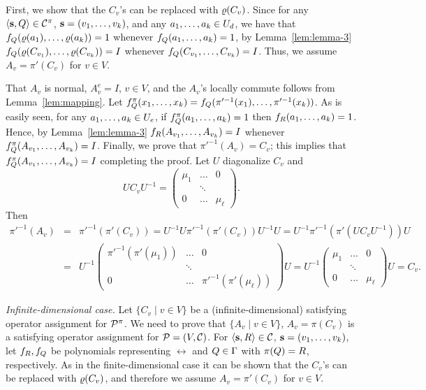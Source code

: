 \documentclass[11pt,letter]{article}
\begin{document}
First, we show that the $C_v$'s can be replaced with $\varrho(C_v)$. Since for any
$\langle {\bf s},Q \rangle\in{\mathcal C}^\pi$, ${\bf s}=(v _1,\ldots, v _{k})$, and any $a _1,\ldots, a _{k}\in U_d$, we have
that $f_Q(\varrho(a_1),\ldots,\varrho(a_k))=1$ whenever $f_Q(a _1,\ldots, a _{k})=1$, by Lemma~\ref{lem:lemma-3} $f_Q(\varrho(C_{v_1}),\ldots,\varrho(C_{v_k}))=I$ whenever $f_Q(C_{v_1},\ldots, C_{v_k})=I$. Thus, we assume $A_v=\pi'(C_v)$ for $v\in V$.

That $A_v$ is normal, $A_v^e=I$, $v\in V$, and the $A_v$'s locally commute follows from Lemma~\ref{lem:mapping}. Let $f^\pi_Q(x _1,\ldots, x _{k})=f_Q(\pi'^{-1}(x_1),\ldots,\pi'^{-1}(x_k))$. As is easily seen, for any $a _1,\ldots, a _{k}\in U_e$, if $f^\pi_Q(a _1,\ldots, a _{k})=1$ then $f_R(a _1,\ldots, a _{k})=1$. Hence, by Lemma~\ref{lem:lemma-3} $f_R(A_{v_1},\ldots, A_{v_k})=I$ whenever $f^\pi_Q(A_{v_1},\ldots, A_{v_k})=I$. Finally, we prove that $\pi'^{-1}(A_v)=C_v$; this implies that $f^\pi_Q(A_{v_1},\ldots, A_{v_k})=I$ completing the proof. Let $U$ diagonalize $C_v$ and 
\[
UC_vU^{-1}=\left(\begin{array}{ccc}\mu_1&\dots&0\\ &\ddots&\\ 0&\dots&\mu_\ell\end{array}\right).
\]
Then
\begin{eqnarray*}
\pi'^{-1}(A_v) &=& \pi'^{-1}(\pi'(C_v))=U^{-1}U\pi'^{-1}(\pi'(C_v))U^{-1}U=U^{-1}\pi'^{-1}(\pi'(UC_vU^{-1}))U\\
&=& U^{-1}\left(\begin{array}{ccc}\pi'^{-1}(\pi'(\mu_1))&\dots&0\\ &\ddots&\\ 0&\dots&\pi'^{-1}(\pi'(\mu_\ell))\end{array}\right)U
= U^{-1}\left(\begin{array}{ccc}\mu_1&\dots&0\\ &\ddots&\\ 0&\dots&\mu_\ell\end{array}\right)U=C_v.
\end{eqnarray*}

{\it Infinite-dimensional case.}
Let $\{C_v\mid v\in V\}$ be a (infinite-dimensional) satisfying operator assignment for ${\mathcal P}^\pi$. We need to prove that $\{A_v\mid v\in V\}$, $A_v=\pi(C_v)$ is a satisfying operator assignment for ${\mathcal P}=(V,{\mathcal C})$. For $\langle {\bf s},R \rangle\in{\mathcal C}$, ${\bf s}=(v _1,\ldots, v _{k})$, let $f_R,f_Q$ be polynomials representing $\rel$ and $Q\in\Gamma$ with $\pi(Q)=R$, respectively. As in the finite-dimensional case it can be shown that the $C_v$'s can be replaced with $\varrho(C_v)$, and therefore we assume $A_v=\pi'(C_v)$ for $v\in V$.
\end{document}
